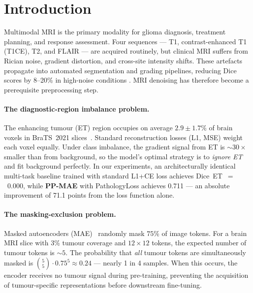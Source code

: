 \documentclass[runningheads]{llncs}
\newcommand{\ppmae}{\textbf{PP-MAE}}
\begin{document}

\section{Introduction}
\label{sec:intro}

Multimodal MRI is the primary modality for glioma diagnosis, treatment
planning, and response assessment.
Four sequences — T1, contrast-enhanced T1 (T1CE), T2, and FLAIR —
are acquired routinely, but clinical MRI suffers from Rician noise,
gradient distortion, and cross-site intensity shifts.
These artefacts propagate into automated segmentation and grading
pipelines, reducing Dice scores by 8–20\% in high-noise conditions
\cite{brats2021}.
MRI denoising has therefore become a prerequisite preprocessing step.

\paragraph{The diagnostic-region imbalance problem.}
The enhancing tumour (ET) region occupies on average $2.9 \pm 1.7$\%
of brain voxels in BraTS~2021 slices~\cite{brats2021}.
Standard reconstruction losses (L1, MSE) weight each voxel equally.
Under class imbalance, the gradient signal from ET is ${\sim}30\times$
smaller than from background, so the model's optimal strategy is to
\emph{ignore ET} and fit background perfectly.
In our experiments, an architecturally identical multi-task baseline
trained with standard L1+CE loss achieves Dice~ET~$=$~0.000,
while \ppmae{} with PathologyLoss achieves 0.711 — an absolute
improvement of 71.1 points from the loss function alone.

\paragraph{The masking-exclusion problem.}
Masked autoencoders (MAE)~\cite{he2022mae} randomly mask $75$\%
of image tokens. For a brain MRI slice with 3\% tumour coverage and
$12 \times 12$ tokens, the expected number of tumour tokens is $\sim 5$.
The probability that \emph{all} tumour tokens are simultaneously masked
is $\binom{5}{5}\cdot 0.75^5 \approx 0.24$ — nearly 1 in 4 samples.
When this occurs, the encoder receives no tumour signal during
pre-training, preventing the acquisition of tumour-specific
representations before downstream fine-tuning.
\end{document}
